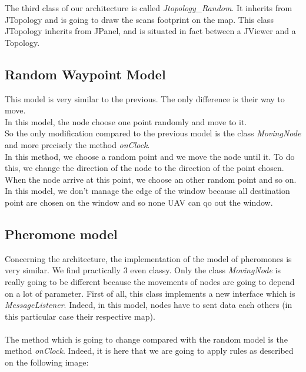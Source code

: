 The third class of our architecture is called \textit{Jtopology\_Random}. It inherits from JTopology and is going to draw the scans footprint on the map. This class JTopology inherits from JPanel, and is situated in fact between a JViewer and a Topology.

\subsection{Random Waypoint Model}

This model is very similar to the previous. The only difference is their way to move.\\
In this model, the node choose one point randomly and move to it.\\
So the only modification compared to the previous model is the class \textit{MovingNode} and more precisely the method \textit{onClock}.\\
In this method, we choose a random point and we move the node until it. To do this, we change the direction of the node to the direction of the point chosen. When the node arrive at this point, we choose an other random point and so on.\\
In this model, we don't manage the edge of the window because all destination point are chosen on the window and so none UAV can qo out the window.


\subsection{Pheromone model}

Concerning the architecture, the implementation of the model of pheromones is very similar. We find practically 3 even classy. Only the class \textit{MovingNode} is really going to be different because the movements of nodes are going to depend on a lot of parameter. First of all, this class implements a new interface which is \textit{MessageListener}. Indeed, in this model, nodes have to sent data each others (in this particular case their respective map).\\\\

The method which is going to change compared with the random model is the method \textit{onClock}. Indeed, it is here that we are going to apply rules as described on the following image:

